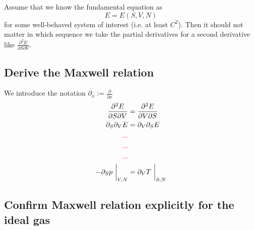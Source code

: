 Assume that we know the fundamental equation as 
\begin{equation}
    E=E(S,V,N) 
\end{equation}
for some well-behaved system of interest (i.e. at least $C^2$). Then it should 
not matter in which sequence we take the partial derivatives for a second 
derivative like $\frac{\partial^2 E}{\partial S\partial V}$.

\subsection{Derive the Maxwell relation}
We introduce the notation $\partial_x:=\frac{\partial}{\partial x}$
\begin{align}
    \frac{\partial^2 E}{\partial S\partial V}
    &=\frac{\partial^2 E}{\partial V\partial S} \\
    \partial_S\partial_V E &=\partial_V\partial_S E \\
    \textcolor{red}{...} \\
    \textcolor{red}{...} \\
    \textcolor{red}{...} \\
    -\partial_S p\ \bigg|_{V,N} &= \partial_V T\ \bigg|_{S,N} 
\end{align}

\subsection{Confirm Maxwell relation explicitly for the ideal gas}

